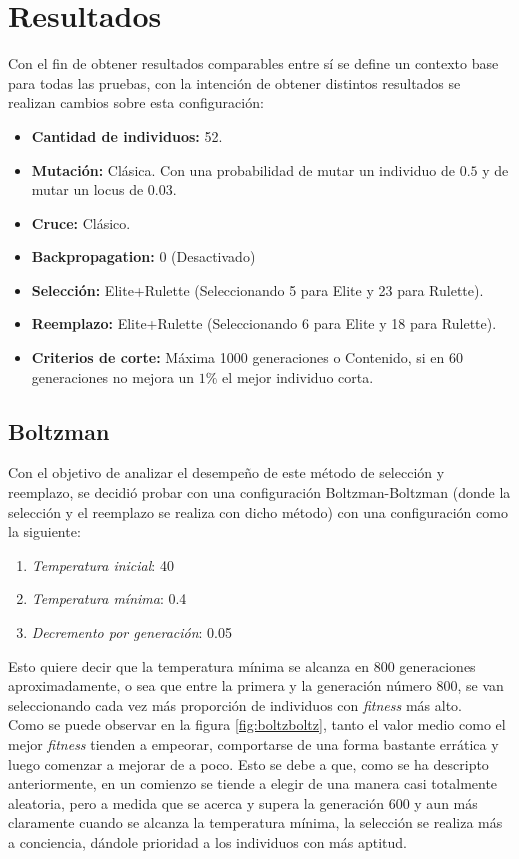 \documentclass{sig-alternate}
\begin{document}
	\section{Resultados}

		Con el fin de obtener resultados comparables entre sí se define un
		contexto base para todas las pruebas, con la intención de obtener distintos 
		resultados se realizan cambios sobre esta configuración:

		\begin{itemize}
			\item \textbf{Cantidad de individuos:} 52.
			\item \textbf{Mutación:} Clásica. Con una probabilidad de mutar un individuo de $0.5$ 
			y de mutar un locus de $0.03$.
			\item \textbf{Cruce:} Clásico.
			\item \textbf{Backpropagation:} 0 (Desactivado)
			\item \textbf{Selección:} Elite+Rulette (Seleccionando 5 para Elite y 23 para Rulette).
			\item \textbf{Reemplazo:} Elite+Rulette (Seleccionando 6 para Elite y 18 para Rulette).
			\item \textbf{Criterios de corte:} Máxima 1000 generaciones o Contenido, si en 60 generaciones
			no mejora un $1\%$ el mejor individuo corta.
		\end{itemize}

		\subsection{Boltzman}

		Con el objetivo de analizar el desempeño de este método de selección y reemplazo, se decidió probar con una configuración Boltzman-Boltzman (donde la selección y el reemplazo se realiza con dicho método) con una configuración como la siguiente:
			
		\begin{enumerate}			
			\item \textit{Temperatura inicial}: 40
			\item \textit{Temperatura mínima}: 0.4
			\item \textit{Decremento por generación}: 0.05
			\label{eq:boltz}
		\end{enumerate}

		Esto quiere decir que la temperatura mínima se alcanza en 800 generaciones aproximadamente, 	o sea que entre la primera y la generación número 800, se van seleccionando cada vez más proporción de individuos con \textit{fitness} más alto.\\
		Como se puede observar en la figura \ref{fig:boltzboltz}, tanto el valor medio como el mejor \textit{fitness} tienden a empeorar, comportarse de una forma bastante errática y luego comenzar a mejorar de a poco. Esto se debe a que, como se ha descripto anteriormente, en un comienzo se tiende a elegir de una manera casi totalmente aleatoria, pero a medida que se acerca y supera la generación 600 y aun más claramente cuando se alcanza la temperatura mínima, la selección se realiza más a conciencia, dándole prioridad a los individuos con más aptitud. 
		
\end{document}
